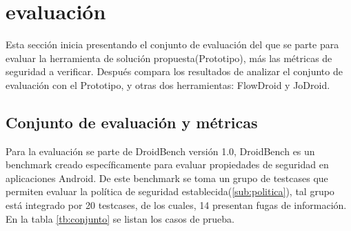\section{evaluación}
\label{sec:eval}
Esta sección inicia presentando el conjunto de evaluación del que se parte para
evaluar la herramienta de solución propuesta(Prototipo), más las métricas de
seguridad a verificar.
Después compara los resultados de analizar el conjunto de evaluación con
el Prototipo, y otras dos herramientas: FlowDroid y JoDroid.

\subsection{Conjunto de evaluación y métricas}
Para la evaluación se parte de DroidBench versión
1.0\cite{DroidBenchBenchmarks}, DroidBench es un benchmark creado
específicamente para evaluar propiedades de seguridad en aplicaciones Android.
De este benchmark se toma un grupo de testcases que permiten evaluar la política
de seguridad establecida(\ref{sub:politica}), tal grupo está integrado por
20 testcases, de los cuales, 14 presentan fugas de información. En la tabla
\ref{tb:conjunto} se listan los casos de prueba.
